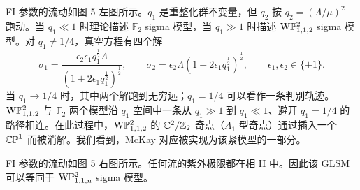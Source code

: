  FI 参数的流动如图 5 左图所示。$q_1$ 是重整化群不变量，但 $q_2$ 按 $q_2=(\Lambda/\mu)^2$ 跑动。当 $q_1\ll 1$ 时理论描述 $\mathbb{F}_2$ sigma 模型，当 $q_1\gg 1$ 时描述 $\mathrm{W}\mathbb{P}^2_{1,1,2}$ sigma 模型。对 $q_1\ne 1/4$，真空方程有四个解
\begin{equation}
    \sigma_1=\frac{\epsilon_2\epsilon_1 q_1^{\frac12}\Lambda}{(1+2\epsilon_1 q_1^{\frac12})^{\frac12}},\qquad
    \sigma_2=\epsilon_2\Lambda(1+2\epsilon_1 q_1^{\frac12})^{\frac12},\qquad
    \epsilon_1,\epsilon_2\in\{\pm1\}. \tag{4.37}
\end{equation}
当 $q_1\to 1/4$ 时，其中两个解跑到无穷远；$q_1=1/4$ 可以看作一条判别轨迹。$\mathrm{W}\mathbb{P}^2_{1,1,2}$ 与 $\mathbb{F}_2$ 两个模型沿 $q_1$ 空间中一条从 $q_1\gg 1$ 到 $q_1\ll 1$、避开 $q_1=1/4$ 的路径相连。在此过程中，$\mathrm{W}\mathbb{P}^2_{1,1,2}$ 的 $\mathbb{C}^2/\mathbb{Z}_2$ 奇点（$A_1$ 型奇点）通过插入一个 $\mathbb{CP}^1$ 而被消解。我们看到，McKay 对应被实现为该紧模型的一部分。

 FI 参数的流动如图 5 右图所示。任何流的紫外极限都在相 II 中。因此该 GLSM 可以等同于 $\mathrm{W}\mathbb{P}^2_{1,1,n}$ sigma 模型。

